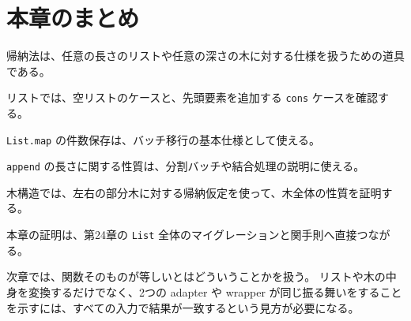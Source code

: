 \section{本章のまとめ}

帰納法は、任意の長さのリストや任意の深さの木に対する仕様を扱うための道具である。

リストでは、空リストのケースと、先頭要素を追加する \texttt{cons} ケースを確認する。

\texttt{List.map} の件数保存は、バッチ移行の基本仕様として使える。

\texttt{append} の長さに関する性質は、分割バッチや結合処理の説明に使える。

木構造では、左右の部分木に対する帰納仮定を使って、木全体の性質を証明する。

本章の証明は、第24章の \texttt{List} 全体のマイグレーションと関手則へ直接つながる。

次章では、関数そのものが等しいとはどういうことかを扱う。
リストや木の中身を変換するだけでなく、2つの adapter や wrapper が同じ振る舞いをすることを示すには、すべての入力で結果が一致するという見方が必要になる。

